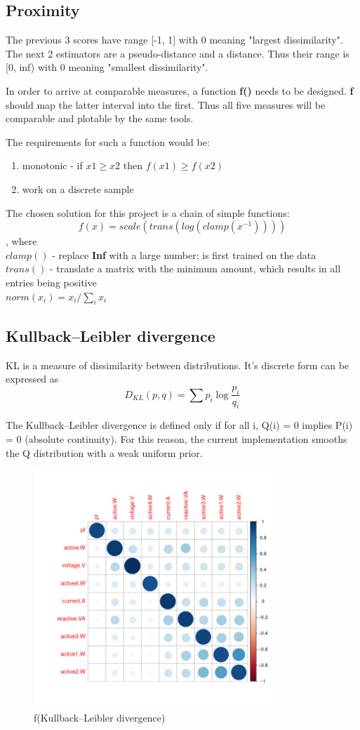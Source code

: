 \documentclass[11pt]{article}
\newcommand{\code}[1]{\textbf{#1}}
\newcommand{\para}[0]{\par\vspace{0.5cm}}
\begin{document}
\subsection{Proximity}
The previous 3 scores have range [-1, 1] with 0 meaning "largest dissimilarity".
The next 2 estimators are a pseudo-distance and a distance.
Thus their range is [0, inf) with 0 meaning "smallest dissimilarity".
\para
In order to arrive at comparable measures, a function \code{f()} needs to be designed.
\code{f} should map the latter interval into the first.
Thus all five measures will be comparable and plotable by the same tools.
\para
The requirements for such a function would be:
\begin{enumerate}
    \item{monotonic - if $x1 \ge x2$ then $f(x1) \ge f(x2)$}
    \item{work on a discrete sample}
\end{enumerate}
\para
The chosen solution for this project is a chain of simple functions:
$$ f(x) = scale(trans(log(clamp(x^{-1})))) $$
, where \\
$ clamp() $ - replace \code{Inf} with a large number; is first trained on the data  \\
$ trans() $ - translate a matrix with the minimum amount, which results in all entries being positive  \\  
$ norm(x_i) = x_i/\sum_i x_i $  \\

\subsection{Kullback–Leibler divergence}
KL is a measure of dissimilarity between distributions.
It's discrete form can be expressed as
$$ D_{KL}(p, q) = \sum p_i \log\frac{p_i}{q_i} $$
\para
The Kullback–Leibler divergence is defined only if for all i, Q(i) = 0 implies P(i) = 0 (absolute continuity).\cite{q11}
For this reason, the current implementation smooths the Q distribution with a weak uniform prior.
\begin{figure}[!htp]
  \centering
    \includegraphics[width=0.8\textwidth]{img/kl}
    \caption{f(Kullback–Leibler divergence)}
\end{figure}
\para
\end{document}
